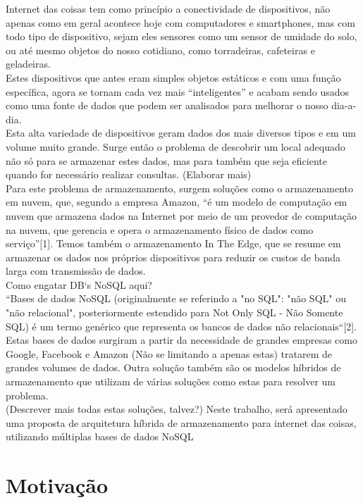 \documentclass[12pt]{article}
\begin{document}
Internet das coisas tem como princípio a conectividade de dispositivos, não apenas como em geral acontece hoje com computadores e smartphones, mas com todo tipo de dispositivo, sejam eles sensores como um sensor de umidade do solo,  ou até mesmo objetos do nosso cotidiano, como torradeiras, cafeteiras e geladeiras.\\
Estes dispositivos que antes eram simples objetos estáticos e com uma função específica, agora se tornam cada vez mais “inteligentes” e acabam sendo usados como uma fonte de dados que podem ser analisados para melhorar o nosso dia-a-dia.\\
Esta alta variedade de dispositivos geram dados dos mais diversos tipos e em um volume muito grande. Surge então o problema de descobrir um local adequado não só para se armazenar estes dados, mas para também que seja eficiente quando for necessário realizar consultas. (Elaborar mais)\\
Para este problema de armazenamento, surgem soluções como o armazenamento em nuvem, que, segundo a empresa Amazon, “é um modelo de computação em nuvem que armazena dados na Internet por meio de um provedor de computação na nuvem, que gerencia e opera o armazenamento físico de dados como serviço”[1]. Temos também o armazenamento In The Edge, que se resume em armazenar os dados nos próprios dispositivos para reduzir os custos de banda larga com transmissão de dados. \\
Como engatar DB`s NoSQL aqui?\\
“Bases de dados NoSQL (originalmente se referindo a "no SQL": "não SQL" ou "não relacional", posteriormente estendido para Not Only SQL - Não Somente SQL) é um termo genérico que representa os bancos de dados não relacionais“[2]. Estas bases de dados surgiram a partir da necessidade de grandes empresas como Google, Facebook e Amazon (Não se limitando a apenas estas) tratarem de grandes volumes de dados.
Outra solução também são os modelos híbridos de armazenamento que utilizam de várias soluções como estas para resolver um problema.\\
(Descrever mais todas estas soluções, talvez?)
Neste trabalho, será apresentado uma proposta de arquitetura híbrida de armazenamento para internet das coisas, utilizando múltiplas bases de dados NoSQL

\section{Motivação} \label{sec:Motivação}
\end{document}
